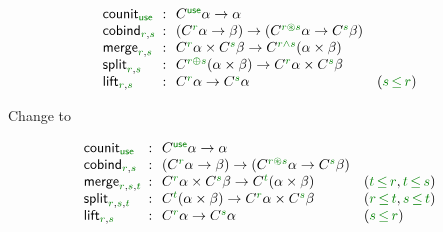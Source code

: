 \begin{equation*}
\begin{array}{lcll}
 \ident{counit}_{\cunit} &\narrow{:}& 
    \ctyp{\cunit}{\alpha} \rightarrow \alpha \\
 \ident{cobind}_{\cclrd{r}, \cclrd{s}} &\narrow{:}& 
    (\ctyp{\cclrd{r}}{\alpha} \rightarrow \beta) \rightarrow (\ctyp{\cclrd{r}\cseq\cclrd{s}}{\alpha} \rightarrow \ctyp{\cclrd{s}}{\beta}) \\
\ident{merge}_{\cclrd{r},\cclrd{s}} &\narrow{:}& 
    \ctyp{\cclrd{r}}{\alpha} \times \ctyp{\cclrd{s}}{\beta} \rightarrow \ctyp{\cclrd{r}\czip\cclrd{s}}{(\alpha \times \beta)} \\
\ident{split}_{\cclrd{r},\cclrd{s}} &\narrow{:}& 
    \ctyp{\cclrd{r}\cpar\cclrd{s}}{(\alpha \times \beta)} \rightarrow \ctyp{\cclrd{r}}{\alpha} \times \ctyp{\cclrd{s}}{\beta} \\
\ident{lift}_{\cclrd{r},\cclrd{s}} &\narrow{:}& 
    \ctyp{\cclrd{r}}{\alpha} \rightarrow \ctyp{\cclrd{s}}{\alpha} & 
    (\cclrd{s}\,\cleq\,\cclrd{r})
\end{array}
\end{equation*}

Change to

\begin{equation*}
\begin{array}{lcll}
 \ident{counit}_{\cunit} &\narrow{:}& 
    \ctyp{\cunit}{\alpha} \rightarrow \alpha \\
 \ident{cobind}_{\cclrd{r}, \cclrd{s}} &\narrow{:}& 
    (\ctyp{\cclrd{r}}{\alpha} \rightarrow \beta) \rightarrow (\ctyp{\cclrd{r}\cseq\cclrd{s}}{\alpha} \rightarrow \ctyp{\cclrd{s}}{\beta}) \\
\ident{merge}_{\cclrd{r},\cclrd{s},\cclrd{t}} &\narrow{:}& 
    \ctyp{\cclrd{r}}{\alpha} \times \ctyp{\cclrd{s}}{\beta} \rightarrow \ctyp{\cclrd{t}}{(\alpha \times \beta)} &
    (\cclrd{t}\,\cleq\,\cclrd{r}, \cclrd{t}\,\cleq\,\cclrd{s}) \\
\ident{split}_{\cclrd{r},\cclrd{s},\cclrd{t}} &\narrow{:}& 
    \ctyp{\cclrd{t}}{(\alpha \times \beta)} \rightarrow \ctyp{\cclrd{r}}{\alpha} \times \ctyp{\cclrd{s}}{\beta} &
    (\cclrd{r}\,\cleq\,\cclrd{t}, \cclrd{s}\,\cleq\,\cclrd{t}) \\
\ident{lift}_{\cclrd{r},\cclrd{s}} &\narrow{:}& 
    \ctyp{\cclrd{r}}{\alpha} \rightarrow \ctyp{\cclrd{s}}{\alpha} & 
    (\cclrd{s}\,\cleq\,\cclrd{r})
\end{array}
\end{equation*}

